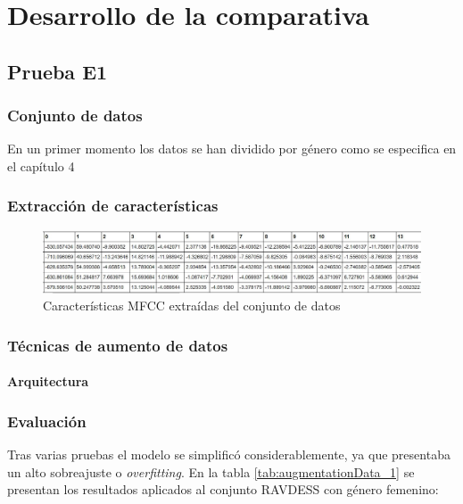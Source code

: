 \documentclass[11pt,a4paper,spanish]{book}
\begin{document}
	\chapter{Desarrollo de la comparativa}
		\section{Prueba E1}
		\subsection{Conjunto de datos}
		En un primer momento los datos se han dividido por género como se especifica en el capítulo 4
		\subsection{Extracción de características}
		\begin{figure}[H]
			\centering
			\includegraphics[scale=0.35]{featuresMFCC.JPG}
			\caption{Características MFCC extraídas del conjunto de datos}
			\label{fig:caract_MFCC}
		\end{figure}
		\subsection{Técnicas de aumento de datos}
		
		\subsubsection{Arquitectura}
		
		
		\subsection{Evaluación}
			Tras varias pruebas el modelo se simplificó considerablemente, ya que presentaba un alto sobreajuste o \emph{overfitting}. En la tabla \ref{tab:augmentationData_1} se presentan los resultados aplicados al conjunto RAVDESS con género femenino:
			
\end{document}
